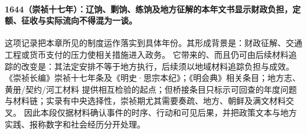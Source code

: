 \paragraph{1644（崇祯十七年）：辽饷、剿饷、练饷及地方征解的本年文书显示财政负担，定额、征收与实际流向不得混为一谈。} 这项记录把本章所见的制度运作落实到具体年份。其形成背景是：财政征解、交通工程或货币支付的压力使相关措施进入政务。 它带来的、而且仍可由后续材料追踪的改变是：其法定安排不等于地方执行，后续须以地域材料追踪负担与成效。 《崇祯长编》崇祯十七年条及《明史·思宗本纪》；《明会典》相关条目；地方志、黄册/契约/河工材料 提供相互检验的起点；但桥接条目只标示可回查的年度问题与材料链；实录有中央选择性，崇祯期尤其需要奏疏、地方、朝鲜及满文材料交叉。 因此本段仅据材料确认事件的时序、行动和可见后果，并把政策文本与地方实践、报称数字和社会经历分开处理。

